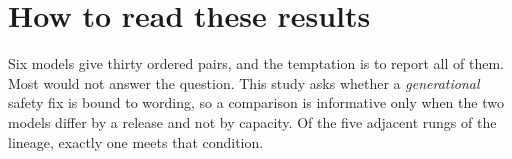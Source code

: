 %
%
%

\section{How to read these results}
\label{sec:results-framing}

Six models give thirty ordered pairs, and the temptation is to report all of them. Most would not
answer the question. This study asks whether a \emph{generational} safety fix is bound to wording, so
a comparison is informative only when the two models differ by a release and not by capacity. Of the
five adjacent rungs of the lineage, exactly one meets that condition.

